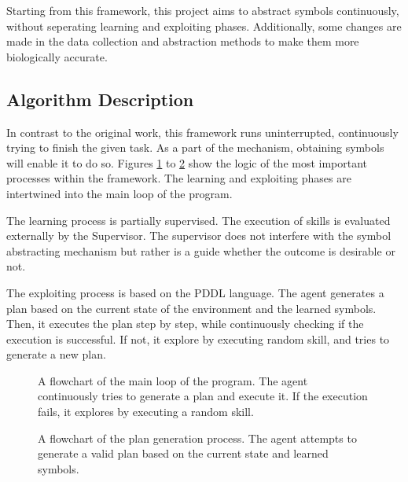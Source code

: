 Starting from this framework, this project aims to abstract symbols continuously, without seperating learning and exploiting phases. Additionally, some changes are made in the data collection and abstraction methods to make them more biologically accurate.

\subsection{Algorithm Description}

In contrast to the original work, this framework runs uninterrupted, continuously trying to finish the given task. As a part of the mechanism, obtaining symbols will enable it to do so. Figures \ref{fig:flow_mainloop} to \ref{fig:flow_generate_plan} show the logic of the most important processes within the framework. The learning and exploiting phases are intertwined into the main loop of the program.

The learning process is partially supervised. The execution of skills is evaluated externally by the Supervisor. The supervisor does not interfere with the symbol abstracting mechanism but rather is a guide whether the outcome is desirable or not.

The exploiting process is based on the PDDL language. The agent generates a plan based on the current state of the environment and the learned symbols. Then, it executes the plan step by step, while continuously checking if the execution is successful. If not, it explore by executing random skill, and tries to generate a new plan.

\begin{figure}[htbp]
    \centering
    {
        
    }
    \caption{A flowchart of the main loop of the program. The agent continuously tries to generate a plan and execute it. If the execution fails, it explores by executing a random skill.} 
    \label{fig:flow_mainloop}
\end{figure}

\begin{figure}[htbp]
    \centering
    {
        
    }
    \caption{A flowchart of the plan generation process. The agent attempts to generate a valid plan based on the current state and learned symbols.} 
    \label{fig:flow_generate_plan}
\end{figure}

